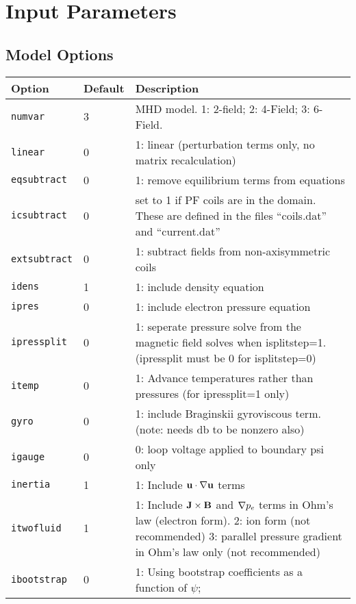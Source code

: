 \section{Input Parameters}
\label{sec:input_parameters}
\subsection{Model Options}

\begin{tabular}{llp{4in}}
  \textbf{Option}&\textbf{Default}&\textbf{Description}\\
  \hline
  \texttt{numvar} & 3   & MHD model. 1: 2-field;  2: 4-Field;  3: 6-Field.\\
  \texttt{linear} & 0   & 1: linear (perturbation terms only, no matrix
  recalculation)\\
  \texttt{eqsubtract}& 0& 1: remove equilibrium terms from equations\\
  \texttt{icsubtract}& 0& set to 1 if PF coils are in the domain.  These are
  defined in the files ``coils.dat'' and ``current.dat''\\
  \texttt{extsubtract} & 0 & 1: subtract fields from non-axisymmetric coils \\
  \texttt{idens}  & 1   & 1: include density equation\\
  \texttt{ipres}  & 0   & 1: include electron pressure equation\\
  \texttt{ipressplit} & 0 & 1: seperate pressure solve from the magnetic field
  solves when isplitstep=1.  (ipressplit must be 0 for isplitstep=0) \\
  \texttt{itemp} & 0 & 1: Advance temperatures rather than pressures (for ipressplit=1 only) \\
  \texttt{gyro}   & 0   & 1: include Braginskii gyroviscous term.  (note:
  needs db to be nonzero also) \\
  \texttt{igauge} & 0   & 0: loop voltage applied to boundary psi only \\
  \texttt{inertia} & 1  & 1: Include $\mathbf{u} \cdot \nabla \mathbf{u}$ terms\\
  \texttt{itwofluid}& 1 & 1: Include $\mathbf{J}\times\mathbf{B}$ and
  $\nabla p_e$ terms in Ohm's law (electron form).  2: ion form (not
  recommended)  3: parallel pressure gradient in Ohm's law only
  (not recommended) \\
  \texttt{ibootstrap} & 0 & 1: Using bootstrap coefficients as a function of $\psi$; \\

\end{tabular}
